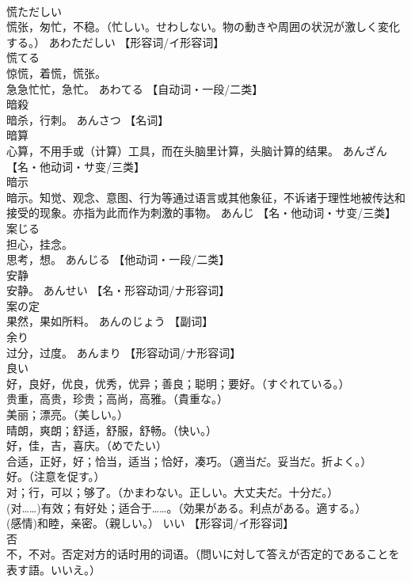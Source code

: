 \documentclass[8pt]{extreport}
\begin{document}
\begin{CJK}{UTF8}{min}
\\	慌ただしい	
\\	慌张，匆忙，不稳。（忙しい。せわしない。物の動きや周囲の状況が激しく変化する。）	あわただしい		【形容词/イ形容词】
\\	慌てる	
\\	惊慌，着慌，慌张。 
\\	急急忙忙，急忙。	あわてる		【自动词・一段/二类】
\\	暗殺	
\\	暗杀，行刺。	あんさつ		【名词】
\\	暗算	
\\	心算，不用手或（计算）工具，而在头脑里计算，头脑计算的结果。	あんざん		【名・他动词・サ变/三类】
\\	暗示	
\\	暗示。知觉、观念、意图、行为等通过语言或其他象征，不诉诸于理性地被传达和接受的现象。亦指为此而作为刺激的事物。	あんじ		【名・他动词・サ变/三类】
\\	案じる	
\\	担心，挂念。 
\\	思考，想。	あんじる		【他动词・一段/二类】
\\	安静	
\\	安静。	あんせい		【名・形容动词/ナ形容词】
\\	案の定	
\\	果然，果如所料。	あんのじょう		【副词】
\\	余り	
\\	过分，过度。	あんまり		【形容动词/ナ形容词】
\\	良い	
\\	好，良好，优良，优秀，优异；善良；聪明；要好。（すぐれている。） 
\\	贵重，高贵，珍贵；高尚，高雅。（貴重な。） 
\\	美丽；漂亮。（美しい。） 
\\	晴朗，爽朗；舒适，舒服，舒畅。（快い。） 
\\	好，佳，吉，喜庆。（めでたい） 
\\	合适，正好，好；恰当，适当；恰好，凑巧。（適当だ。妥当だ。折よく。） 
\\	好。（注意を促す。） 
\\	对；行，可以；够了。（かまわない。正しい。大丈夫だ。十分だ。） 
\\	(对……)有效；有好处；适合于……。（効果がある。利点がある。適する。） 
\\	(感情)和睦，亲密。（親しい。）	いい		【形容词/イ形容词】
\\	否	
\\	不，不对。否定对方的话时用的词语。（問いに対して答えが否定的であることを表す語。いいえ。） 

\end{CJK}
\end{document}
